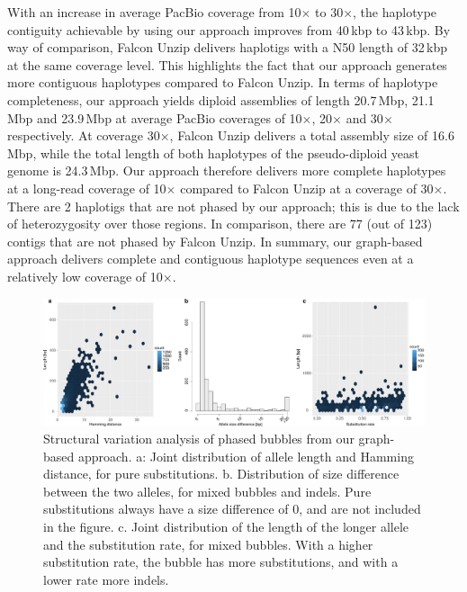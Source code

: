With an increase in average PacBio coverage from 10$\times$ to 30$\times$, the haplotype contiguity achievable by using our approach improves from 40\,kbp to 43\,kbp.
By way of comparison, Falcon Unzip delivers haplotigs with a N50 length of 32\,kbp at the same coverage level. This highlights the fact that our approach generates more contiguous haplotypes compared to Falcon Unzip.
In terms of haplotype completeness, our approach yields diploid assemblies of length 20.7\,Mbp, 21.1\,Mbp and 23.9\,Mbp at average PacBio coverages of 10$\times$, 20$\times$ and 30$\times$ respectively.
At coverage 30$\times$, Falcon Unzip delivers a total assembly size of 16.6\,Mbp, while the total length of both haplotypes of the pseudo-diploid yeast genome is 24.3\,Mbp.
Our approach therefore delivers more complete haplotypes at a long-read coverage of 10$\times$ compared to Falcon Unzip at a coverage of 30$\times$.
There are 2 haplotigs that are not phased by our approach; this is due to the lack of heterozygosity over those regions.
In comparison, there are 77 (out of 123) contigs that are not phased by Falcon Unzip.
In summary, our graph-based approach delivers complete and contiguous haplotype sequences even at a relatively low coverage of 10$\times$.
\begin{figure}[t!]
\begin{center}
\includegraphics[width=\textwidth]{bubble-breakdown}%
\end{center}
\caption{Structural variation analysis of phased bubbles from our graph-based approach.
a: Joint distribution of allele length and Hamming distance, for pure substitutions.
b. Distribution of size difference between the two alleles, for mixed bubbles and indels. 
Pure substitutions always have a size difference of 0, and are not included in the figure.
c. Joint distribution of the length of the longer allele and the substitution rate, for mixed bubbles.
With a higher substitution rate, the bubble has more substitutions, and with a lower rate more indels.
}
\label{fig:bubble_breakdown}
\end{figure}

